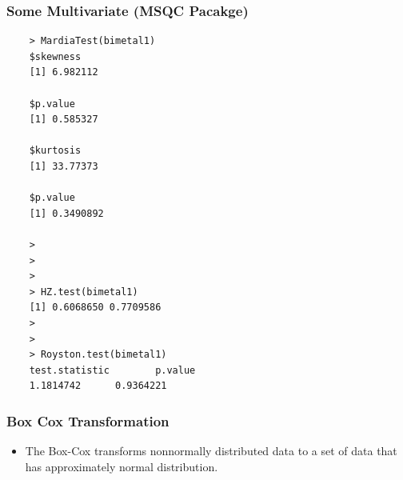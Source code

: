 \documentclass[]{report}
\begin{document}
\subsubsection{Some Multivariate (MSQC Pacakge)}
\begin{framed}
	\begin{verbatim}
	> MardiaTest(bimetal1)
	$skewness
	[1] 6.982112
	
	$p.value
	[1] 0.585327
	
	$kurtosis
	[1] 33.77373
	
	$p.value
	[1] 0.3490892
	
	> 
	>
	>
	> HZ.test(bimetal1)
	[1] 0.6068650 0.7709586
	> 
	> 
	> Royston.test(bimetal1)
	test.statistic        p.value 
	1.1814742      0.9364221 
	\end{verbatim}
\end{framed}




\subsubsection{Box Cox Transformation}
\begin{itemize}
	\item The Box-Cox transforms nonnormally distributed data to a set of  data that has approximately normal distribution. 
\end{itemize}
\newpage


\newpage
\end{document}
